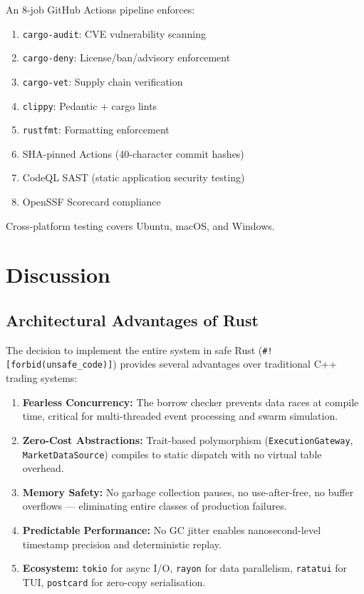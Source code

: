 \documentclass[11pt]{article}
\theoremstyle{definition}
\begin{document}
An 8-job GitHub Actions pipeline enforces:
\begin{enumerate}[leftmargin=*,topsep=2pt,itemsep=1pt]
  \item \texttt{cargo-audit}: CVE vulnerability scanning
  \item \texttt{cargo-deny}: License/ban/advisory enforcement
  \item \texttt{cargo-vet}: Supply chain verification
  \item \texttt{clippy}: Pedantic + cargo lints
  \item \texttt{rustfmt}: Formatting enforcement
  \item SHA-pinned Actions (40-character commit hashes)
  \item CodeQL SAST (static application security testing)
  \item OpenSSF Scorecard compliance
\end{enumerate}

Cross-platform testing covers Ubuntu, macOS, and Windows.

\section{Discussion}
\label{sec:discussion}

\subsection{Architectural Advantages of Rust}

The decision to implement the entire system in safe Rust
(\texttt{\#![forbid(unsafe\_code)]}) provides several
advantages over traditional C++ trading systems:

\begin{enumerate}[leftmargin=*,topsep=2pt,itemsep=1pt]
  \item \textbf{Fearless Concurrency:} The borrow checker
        prevents data races at compile time, critical for
        multi-threaded event processing and swarm simulation.
  \item \textbf{Zero-Cost Abstractions:} Trait-based
        polymorphism (\texttt{ExecutionGateway}, \texttt{MarketDataSource})
        compiles to static dispatch with no virtual table overhead.
  \item \textbf{Memory Safety:} No garbage collection pauses,
        no use-after-free, no buffer overflows --- eliminating
        entire classes of production failures.
  \item \textbf{Predictable Performance:} No GC jitter enables
        nanosecond-level timestamp precision and deterministic
        replay.
  \item \textbf{Ecosystem:} \texttt{tokio} for async I/O,
        \texttt{rayon} for data parallelism, \texttt{ratatui}
        for TUI, \texttt{postcard} for zero-copy serialisation.
\end{enumerate}
\end{document}

